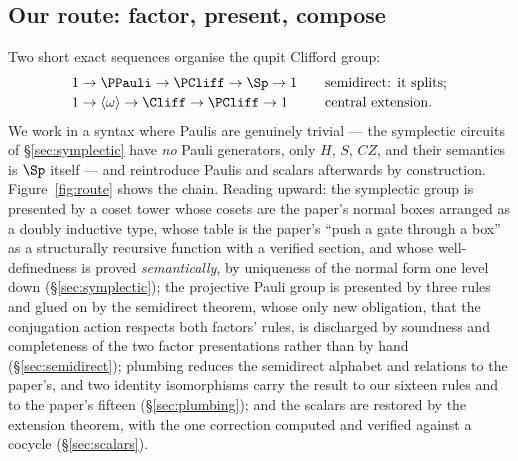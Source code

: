 \subsection{Our route: factor, present, compose}\label{sec:ourroute}

Two short exact sequences organise the qupit Clifford group:
\[
  \begin{array}{l@{\qquad}l}
  1 \to \PPauli \to \PCliff \to \Sp \to 1 & \text{semidirect: it splits;}\\[2pt]
  1 \to \langle\omega\rangle \to \Cliff \to \PCliff \to 1 & \text{central extension.}
  \end{array}
\]
We work in a syntax where Paulis are genuinely trivial --- the
symplectic circuits of \S\ref{sec:symplectic} have \emph{no} Pauli
generators, only $H$, $S$, $CZ$, and their semantics is $\Sp$ itself ---
and reintroduce Paulis and scalars afterwards by construction.
Figure~\ref{fig:route} shows the chain.  Reading upward: the symplectic
group is presented by a coset tower whose cosets are the paper's normal
boxes arranged as a doubly inductive type, whose table is the paper's
``push a gate through a box'' as a structurally recursive function with
a verified section, and whose well-definedness is proved
\emph{semantically}, by uniqueness of the normal form one level down
(\S\ref{sec:symplectic}); the projective Pauli group is presented by
three rules and glued on by the semidirect theorem, whose only new
obligation, that the conjugation action respects both factors' rules, is
discharged by soundness and completeness of the two factor presentations
rather than by hand (\S\ref{sec:semidirect}); plumbing reduces the
semidirect alphabet and relations to the paper's, and two identity
isomorphisms carry the result to our sixteen rules and to the paper's
fifteen (\S\ref{sec:plumbing}); and the scalars are restored by the
extension theorem, with the one correction computed and verified against
a cocycle (\S\ref{sec:scalars}).

